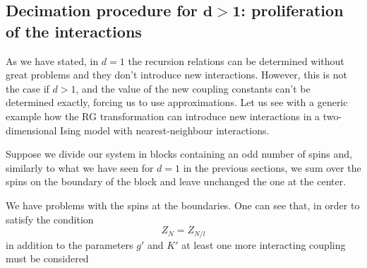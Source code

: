 \documentclass[../main/main.tex]{subfiles}
\begin{document}
\subsection{Decimation procedure for \( \pmb{d>1} \): proliferation of the interactions}
As we have stated, in \( d=1 \) the recursion relations can be determined without great problems and they don't introduce new interactions. However, this is not the case if \( d>1 \), and the value of the new coupling constants can't be determined exactly, forcing us to use approximations. Let us see with a generic example how the RG transformation can introduce new interactions in a two-dimensional Ising model with nearest-neighbour interactions.

Suppose we divide our system in blocks containing an odd number of spins and, similarly to what we have seen for \( d=1 \) in the previous sections, we sum over the spins on the boundary of the block and leave unchanged the one at the center.

We have problems with the spins at the boundaries. One can see that, in order to satisfy the condition
\begin{equation*}
  Z_N = Z_{N/l}
\end{equation*}
in addition to the parameters \( g' \) and \( K' \) at least one more interacting coupling must be considered
\end{document}
